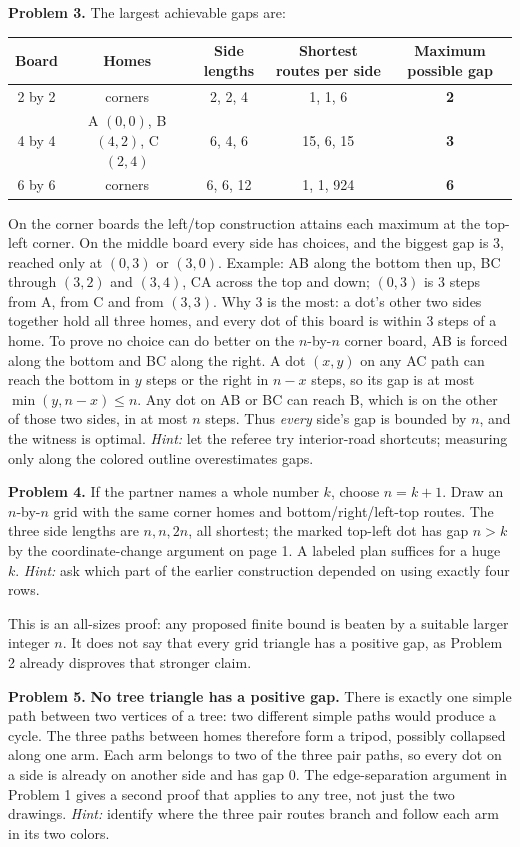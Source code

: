 \documentclass[11pt,letterpaper]{article}
\begin{document}
\textbf{Problem 3.} The largest achievable gaps are:
\begin{center}\renewcommand{\arraystretch}{1.15}
\begin{tabular}{@{}ccccc@{}}\toprule
Board & Homes & Side lengths & Shortest routes per side & Maximum possible gap\\\midrule
2 by 2 & corners & 2, 2, 4 & 1, 1, 6 & \textbf{2}\\
4 by 4 & A $(0,0)$, B $(4,2)$, C $(2,4)$ & 6, 4, 6 & 15, 6, 15 & \textbf{3}\\
6 by 6 & corners & 6, 6, 12 & 1, 1, 924 & \textbf{6}\\\bottomrule
\end{tabular}\end{center}
On the corner boards the left/top construction attains each maximum at the top-left corner. On the middle board every side has choices, and the biggest gap is 3, reached only at $(0,3)$ or $(3,0)$. Example: AB along the bottom then up, BC through $(3,2)$ and $(3,4)$, CA across the top and down; $(0,3)$ is 3 steps from A, from C and from $(3,3)$. Why 3 is the most: a dot's other two sides together hold all three homes, and every dot of this board is within 3 steps of a home. To prove no choice can do better on the $n$-by-$n$ corner board, AB is forced along the bottom and BC along the right. A dot $(x,y)$ on any AC path can reach the bottom in $y$ steps or the right in $n-x$ steps, so its gap is at most $\min(y,n-x)\le n$. Any dot on AB or BC can reach B, which is on the other of those two sides, in at most $n$ steps. Thus \emph{every} side's gap is bounded by $n$, and the witness is optimal. \emph{Hint:} let the referee try interior-road shortcuts; measuring only along the colored outline overestimates gaps.

\textbf{Problem 4.} If the partner names a whole number $k$, choose \textbf{$n=k+1$}. Draw an $n$-by-$n$ grid with the same corner homes and bottom/right/left-top routes. The three side lengths are $n,n,2n$, all shortest; the marked top-left dot has gap $n>k$ by the coordinate-change argument on page 1. A labeled plan suffices for a huge $k$. \emph{Hint:} ask which part of the earlier construction depended on using exactly four rows.

This is an all-sizes proof: any proposed finite bound is beaten by a suitable larger integer $n$. It does not say that every grid triangle has a positive gap, as Problem 2 already disproves that stronger claim.

\textbf{Problem 5.} \textbf{No tree triangle has a positive gap.} There is exactly one simple path between two vertices of a tree: two different simple paths would produce a cycle. The three paths between homes therefore form a tripod, possibly collapsed along one arm. Each arm belongs to two of the three pair paths, so every dot on a side is already on another side and has gap 0. The edge-separation argument in Problem 1 gives a second proof that applies to any tree, not just the two drawings. \emph{Hint:} identify where the three pair routes branch and follow each arm in its two colors.
\end{document}
